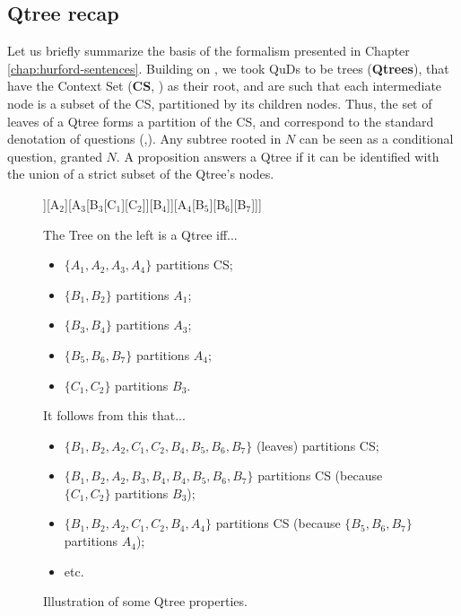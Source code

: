 	\subsection{Qtree recap}
	Let us briefly summarize the basis of the formalism presented in Chapter \ref{chap:hurford-sentences}. Building on \citet{Buring2003,Riester2019,Onea2016,Zhang2024}, we took QuDs to be trees (\textbf{Qtrees}), that have the Context Set (\textbf{CS}, \cite{Stalnaker1974}) as their root, and are such that each intermediate node is a subset of the CS, partitioned by its children nodes. Thus, the set of leaves of a Qtree forms a partition of the CS, and correspond to the standard denotation of questions (,). Any subtree rooted in $N$ can be seen as a conditional question, granted $N$. A proposition answers a Qtree if it can be identified with the union of a strict subset of the Qtree's nodes.
	
	\begin{figure}[H]
		\begin{multicols}{2}
			\begin{forest}
				[CS[A$_1$ [B$_1$][B$_2$]][A$_2$][A$_3$[B$_3$[C$_1$][C$_2$]][B$_4$]][A$_4$[B$_5$][B$_6$][B$_7$]]]
			\end{forest}
			\columnbreak
			\begin{small}

				The Tree on the left is a Qtree iff...
				\begin{itemize}
					\item $\lbrace A_1, A_2, A_3, A_4\rbrace$ partitions CS;
					\item $\lbrace B_1, B_2\rbrace$ partitions $A_1$;
					\item  $\lbrace B_3, B_4\rbrace$ partitions $A_3$;
					\item $\lbrace B_5, B_6, B_7\rbrace$ partitions $A_4$;
					\item $\lbrace C_1, C_2\rbrace$ partitions $B_3$.
				\end{itemize}
			\end{small}
		\end{multicols}
			\small
			It follows from this that...
			\begin{itemize}
				\item $\lbrace B_1, B_2, A_2, C_1, C_2, B_4, B_5, B_6, B_7\rbrace$ (leaves) partitions CS;
				\item $\lbrace B_1, B_2, A_2, B_3, B_4, B_4, B_5, B_6, B_7\rbrace$ partitions CS (because $\lbrace C_1, C_2\rbrace$ partitions $B_3$);
				\item $\lbrace B_1, B_2, A_2, C_1, C_2, B_4, A_4\rbrace$ partitions CS (because $\lbrace B_5, B_6, B_7\rbrace$ partitions $A_4$);
				\item etc.
			\end{itemize}
		\caption{Illustration of some Qtree properties.}
	\end{figure}
	
